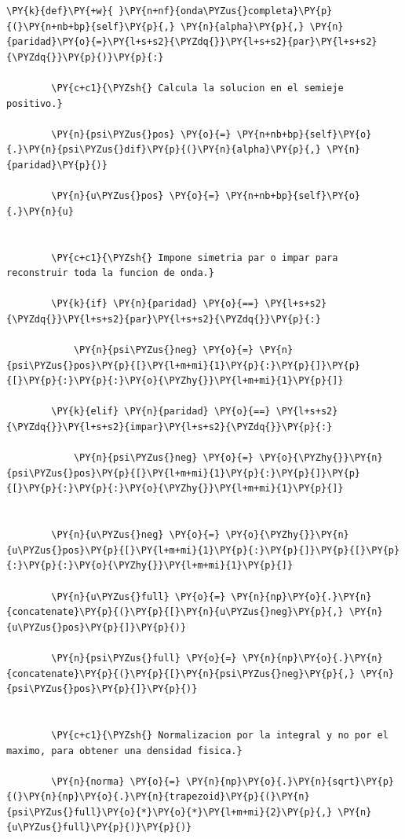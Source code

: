 \documentclass[11pt]{article}
\makeatletter
\def\PY@reset{\let\PY@it=\relax \let\PY@bf=\relax \let\PY@ul=\relax \let\PY@tc=\relax \let\PY@bc=\relax \let\PY@ff=\relax}
\def\PY@tok#1{\csname PY@tok@#1\endcsname}
\def\PY@toks#1+{\ifx\relax#1\empty\else \PY@tok{#1}\expandafter\PY@toks\fi}
\def\PY@do#1{\PY@bc{\PY@tc{\PY@ul{\PY@it{\PY@bf{\PY@ff{#1}}}}}}}
\def\PY#1#2{\PY@reset\PY@toks#1+\relax+\PY@do{#2}}
\makeatother
\begin{document}
\begin{tcolorbox}[breakable, size=fbox, boxrule=1pt, pad at break*=1mm,colback=cellbackground, colframe=cellborder]
\begin{Verbatim}[commandchars=\\\{\}]
    \PY{k}{def}\PY{+w}{ }\PY{n+nf}{onda\PYZus{}completa}\PY{p}{(}\PY{n+nb+bp}{self}\PY{p}{,} \PY{n}{alpha}\PY{p}{,} \PY{n}{paridad}\PY{o}{=}\PY{l+s+s2}{\PYZdq{}}\PY{l+s+s2}{par}\PY{l+s+s2}{\PYZdq{}}\PY{p}{)}\PY{p}{:}

        \PY{c+c1}{\PYZsh{} Calcula la solucion en el semieje positivo.}

        \PY{n}{psi\PYZus{}pos} \PY{o}{=} \PY{n+nb+bp}{self}\PY{o}{.}\PY{n}{psi\PYZus{}dif}\PY{p}{(}\PY{n}{alpha}\PY{p}{,} \PY{n}{paridad}\PY{p}{)}

        \PY{n}{u\PYZus{}pos} \PY{o}{=} \PY{n+nb+bp}{self}\PY{o}{.}\PY{n}{u}


        \PY{c+c1}{\PYZsh{} Impone simetria par o impar para reconstruir toda la funcion de onda.}

        \PY{k}{if} \PY{n}{paridad} \PY{o}{==} \PY{l+s+s2}{\PYZdq{}}\PY{l+s+s2}{par}\PY{l+s+s2}{\PYZdq{}}\PY{p}{:}

            \PY{n}{psi\PYZus{}neg} \PY{o}{=} \PY{n}{psi\PYZus{}pos}\PY{p}{[}\PY{l+m+mi}{1}\PY{p}{:}\PY{p}{]}\PY{p}{[}\PY{p}{:}\PY{p}{:}\PY{o}{\PYZhy{}}\PY{l+m+mi}{1}\PY{p}{]}

        \PY{k}{elif} \PY{n}{paridad} \PY{o}{==} \PY{l+s+s2}{\PYZdq{}}\PY{l+s+s2}{impar}\PY{l+s+s2}{\PYZdq{}}\PY{p}{:}

            \PY{n}{psi\PYZus{}neg} \PY{o}{=} \PY{o}{\PYZhy{}}\PY{n}{psi\PYZus{}pos}\PY{p}{[}\PY{l+m+mi}{1}\PY{p}{:}\PY{p}{]}\PY{p}{[}\PY{p}{:}\PY{p}{:}\PY{o}{\PYZhy{}}\PY{l+m+mi}{1}\PY{p}{]}


        \PY{n}{u\PYZus{}neg} \PY{o}{=} \PY{o}{\PYZhy{}}\PY{n}{u\PYZus{}pos}\PY{p}{[}\PY{l+m+mi}{1}\PY{p}{:}\PY{p}{]}\PY{p}{[}\PY{p}{:}\PY{p}{:}\PY{o}{\PYZhy{}}\PY{l+m+mi}{1}\PY{p}{]}

        \PY{n}{u\PYZus{}full} \PY{o}{=} \PY{n}{np}\PY{o}{.}\PY{n}{concatenate}\PY{p}{(}\PY{p}{[}\PY{n}{u\PYZus{}neg}\PY{p}{,} \PY{n}{u\PYZus{}pos}\PY{p}{]}\PY{p}{)}

        \PY{n}{psi\PYZus{}full} \PY{o}{=} \PY{n}{np}\PY{o}{.}\PY{n}{concatenate}\PY{p}{(}\PY{p}{[}\PY{n}{psi\PYZus{}neg}\PY{p}{,} \PY{n}{psi\PYZus{}pos}\PY{p}{]}\PY{p}{)}


        \PY{c+c1}{\PYZsh{} Normalizacion por la integral y no por el maximo, para obtener una densidad fisica.}

        \PY{n}{norma} \PY{o}{=} \PY{n}{np}\PY{o}{.}\PY{n}{sqrt}\PY{p}{(}\PY{n}{np}\PY{o}{.}\PY{n}{trapezoid}\PY{p}{(}\PY{n}{psi\PYZus{}full}\PY{o}{*}\PY{o}{*}\PY{l+m+mi}{2}\PY{p}{,} \PY{n}{u\PYZus{}full}\PY{p}{)}\PY{p}{)}


\end{Verbatim}
\end{tcolorbox}
\end{document}
